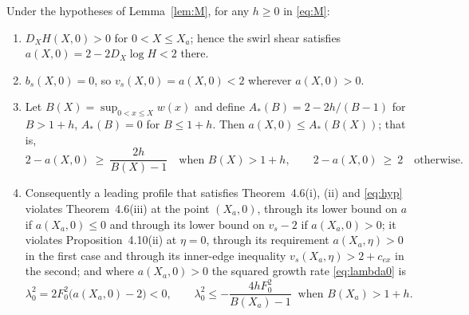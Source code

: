 \documentclass[11pt]{article}
\newcommand{\DX}{D_X}
\newcommand{\bs}{b_s}
\newcommand{\vs}{v_s}
\begin{document}
\begin{theorem}\label{thm:barrier}
Under the hypotheses of Lemma~\ref{lem:M}, for any $h\ge0$ in \eqref{eq:M}:
\begin{enumerate}
\item $\DX H(X,0)>0$ for $0<X\le X_a$; hence the swirl shear satisfies $a(X,0)=2-2\DX\log H<2$ there.
\item $\bs(X,0)=0$, so $\vs(X,0)=a(X,0)<2$ wherever $a(X,0)>0$.
\item Let $B(X)=\sup_{0<x\le X}w(x)$ and define $A_*(B)=2-2h/(B-1)$ for $B>1+h$, $A_*(B)=0$ for $B\le1+h$. Then $a(X,0)\le A_*(B(X))$; that is,
\begin{equation}\label{eq:margin}
2-a(X,0)\ \ge\ \frac{2h}{B(X)-1}\quad\text{when }B(X)>1+h,\qquad 2-a(X,0)\ \ge\ 2\quad\text{otherwise.}
\end{equation}
\item Consequently a leading profile that satisfies Theorem~4.6(i), (ii) and \eqref{eq:hyp} violates Theorem~4.6(iii) at the point $(X_a,0)$, through its lower bound on $a$ if $a(X_a,0)\le0$ and through its lower bound on $\vs-2$ if $a(X_a,0)>0$; it violates Proposition~4.10(ii) at $\eta=0$, through its requirement $a(X_a,\eta)>0$ in the first case and through its inner-edge inequality $\vs(X_a,\eta)>2+c_{ex}$ in the second; and where $a(X_a,0)>0$ the squared growth rate \eqref{eq:lambda0} is
\[
\lambda_0^2=2F_0^2\bigl(a(X_a,0)-2\bigr)<0,\qquad \lambda_0^2\le-\frac{4hF_0^2}{B(X_a)-1}\ \text{ when }B(X_a)>1+h .
\]
\end{enumerate}
\end{theorem}
\end{document}
